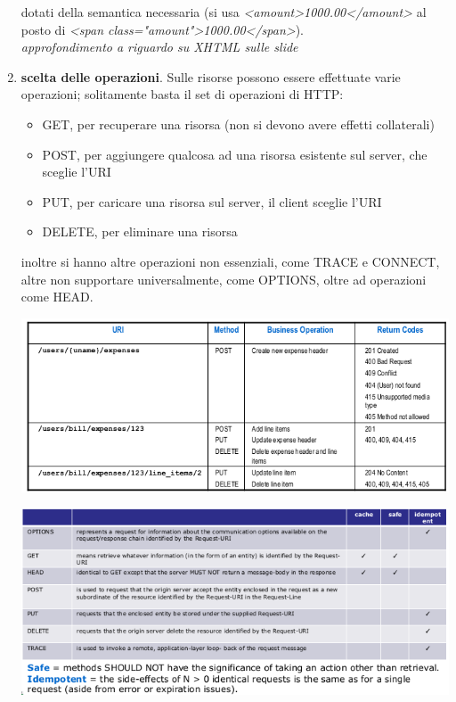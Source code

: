\documentclass[a4paper,12pt, oneside]{book}
\begin{document}
\begin{enumerate}
  dotati della semantica necessaria (si usa \textit{<amount>1000.00</amount>} al posto di \textit{<span class="amount">1000.00</span>}).\\
  \textit{approfondimento a riguardo su XHTML sulle slide}
\item \textbf{scelta delle operazioni}. Sulle risorse possono essere effettuate varie operazioni; solitamente basta il set di operazioni di HTTP:
  \begin{itemize}
  \item GET, per recuperare una risorsa (non si devono avere effetti collaterali)
  \item POST, per aggiungere qualcosa ad una risorsa esistente sul server, che sceglie l'URI
  \item PUT, per caricare una risorsa sul server, il client sceglie l'URI
  \item DELETE, per eliminare una risorsa
  \end{itemize}
  inoltre si hanno altre operazioni non essenziali, come TRACE e CONNECT, altre non supportare universalmente, come OPTIONS, oltre ad operazioni come HEAD.\\
  \begin{center}
    \includegraphics[scale=0.6]{img/app1.png}
  \end{center}
  \begin{center}
    \includegraphics[scale=0.6]{img/app2.png}
  \end{center}

\end{enumerate}
\end{document}
